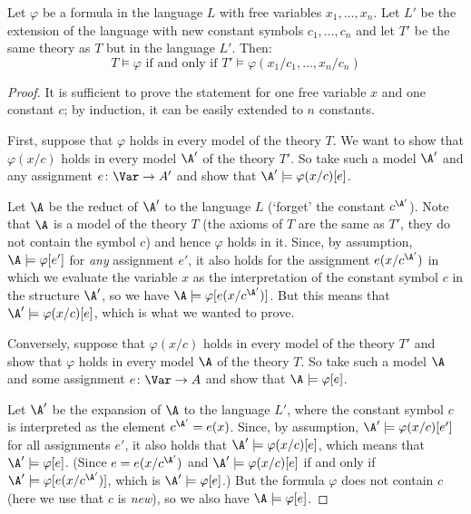\begin{theorem}\label{theorem:on-constants}
    Let $\varphi$ be a formula in the language $L$ with free variables $x_1,\dots,x_n$. Let $L'$ be the extension of the language with new constant symbols $c_1,\dots,c_n$ and let $T'$ be the same theory as $T$ but in the language $L'$. Then:
    $$
    T\models\varphi\text{ if and only if }T'\models\varphi(x_1/c_1,\dots,x_n/c_n)
    $$
\end{theorem}
\begin{proof}
    It is sufficient to prove the statement for one free variable $x$ and one constant $c$; by induction, it can be easily extended to $n$ constants.
    
    First, suppose that $\varphi$ holds in every model of the theory $T$. We want to show that $\varphi(x/c)$ holds in every model $\A'$ of the theory $T'$. So take such a model $\A'$ and any assignment $e\colon\Var\to A'$ and show that $\A'\models\varphi(x/c)[e]$.

    Let $\A$ be the reduct of $\A'$ to the language $L$ (`forget' the constant $c^{\A'}$). Note that $\A$ is a model of the theory $T$ (the axioms of $T$ are the same as $T'$, they do not contain the symbol $c$) and hence $\varphi$ holds in it. Since, by assumption, $\A\models\varphi[e']$ for \emph{any} assignment $e'$, it also holds for the assignment $e(x/c^{\A'})$ in which we evaluate the variable $x$ as the interpretation of the constant symbol $c$ in the structure $\A'$, so we have $\A\models\varphi[e(x/c^{\A'})]$. But this means that $\A'\models\varphi(x/c)[e]$, which is what we wanted to prove.
    
    Conversely, suppose that $\varphi(x/c)$ holds in every model of the theory $T'$ and show that $\varphi$ holds in every model $\A$ of the theory $T$. So take such a model $\A$ and some assignment $e\colon\Var\to A$ and show that $\A\models\varphi[e]$.

    Let $\A'$ be the expansion of $\A$ to the language $L'$, where the constant symbol $c$ is interpreted as the element $c^{\A'}=e(x)$. Since, by assumption, $\A'\models\varphi(x/c)[e']$ for all assignments $e'$, it also holds that $\A'\models\varphi(x/c)[e]$, which means that $\A'\models\varphi[e]$. (Since $e=e(x/c^{\A'})$ and $\A'\models\varphi(x/c)[e]$ if and only if $\A'\models\varphi[e(x/c^{\A'})]$, which is $\A'\models\varphi[e]$.) But the formula $\varphi$ does not contain $c$ (here we use that $c$ is \emph{new}), so we also have $\A\models\varphi[e]$.
\end{proof}


